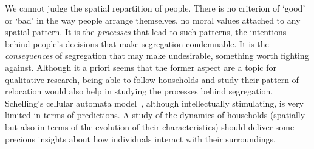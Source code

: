 We cannot judge the spatial repartition of people. There is no criterion of
`good' or `bad' in the way people arrange themselves, no moral values attached 
to any spatial pattern. It is the \emph{processes} that lead to such
patterns, the intentions behind people's decisions that make segregation
condemnable. It is the \emph{consequences} of segregation that may make
undesirable, something worth fighting against. Although it a priori seems that
the former aspect are a topic for qualitative research, being able to follow
households and study their pattern of relocation would also help in studying
the processes behind segregation. Schelling's cellular automata
model~\cite{Schelling:1971}, although intellectually stimulating, is very
limited in terms of predictions. A study of the dynamics of households
(spatially but also in terms of the evolution of their characteristics) should
deliver some precious insights about how individuals interact with their
surroundings.


